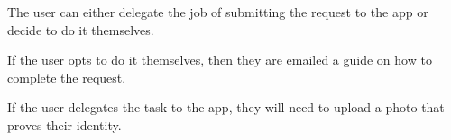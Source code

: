 \begin{minipage}{\textwidth}
  \centering
  \begin{minipage}[t]{4.6cm}
    \vspace{0pt}
    \centering
    \begin{minipage}{4.4cm}
      The user can either delegate the job of submitting the request to the app or decide to do it themselves.
    \end{minipage}
  \end{minipage}
  \begin{minipage}[t]{4.6cm}
    \vspace{0pt}
    \centering
    \begin{minipage}{4.4cm}
      If the user opts to do it themselves, then they are emailed a guide on how to complete the request.
    \end{minipage}
  \end{minipage}
  \begin{minipage}[t]{4.6cm}
    \vspace{0pt}
    \centering
    \begin{minipage}{4.4cm}
      If the user delegates the task to the app, they will need to upload a photo that proves their identity.
    \end{minipage}
  \end{minipage}
\end{minipage}

